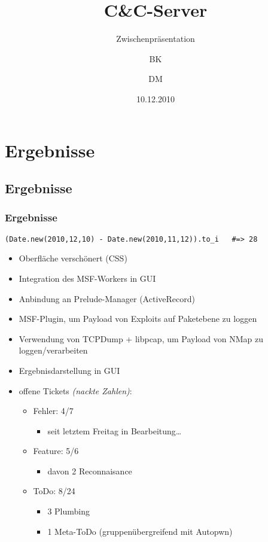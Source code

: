 \documentclass[authorinfoot]{fidius-p}
\author{BK \and DM}
\title{C\&C-Server}
\subtitle{Zwischenpräsentation}
\date{10.12.2010}
\begin{document}
\frame{\titlepage}
\frame{\tableofcontents}

\section{Ergebnisse}
\subsection{Ergebnisse}
\begin{frame}
  \frametitle{Ergebnisse}
  \begin{lstlisting}[gobble=4]
    (Date.new(2010,12,10) - Date.new(2010,11,12)).to_i   #=> 28
  \end{lstlisting}
  \begin{itemize}
    \item Oberfläche verschönert (CSS)
    \item Integration des MSF-Workers in GUI
    \item Anbindung an Prelude-Manager (ActiveRecord)
    \item MSF-Plugin, um Payload von Exploits auf Paketebene zu loggen
    \item Verwendung von TCPDump + libpcap, um Payload von NMap zu loggen/verarbeiten
    \item Ergebnisdarstellung in GUI
    \vspace*{1em}
    \pause
    \item offene Tickets \textit{(nackte Zahlen)}:
    \begin{itemize}
      \item Fehler: 4/7
      \begin{itemize}
        \item seit letztem Freitag in Bearbeitung\dots
      \end{itemize}
      \item Feature: 5/6
      \begin{itemize}
        \item davon 2 Reconnaisance
      \end{itemize}
      \item ToDo: 8/24
      \begin{itemize}
        \item 3 Plumbing
        \item 1 Meta-ToDo (gruppenübergreifend mit Autopwn)
      \end{itemize}
    \end{itemize}
  \end{itemize}
\end{frame}
\end{document}
